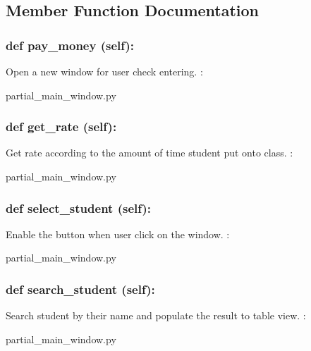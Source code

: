 \subsection{Member Function Documentation}
\hypertarget{class_poly_a14a7ad77ce612b0c54f531d307ee4b39}{
\subsubsection[{def pay_money (self):}]{\setlength{\rightskip}{0pt plus 5cm}def {pay\_money} (self):}}\label{class_poly_a14a7ad77ce612b0c54f531d307ee4b39}
Open a new window for user check entering.
:\begin{DoxyCompactItemize}
\item 
partial\_main\_window.\-py\end{DoxyCompactItemize}

\hypertarget{class_poly_a14a7ad77ce612b0c54f531d307ee4b39}{
\subsubsection[{def get_rate (self):}]{\setlength{\rightskip}{0pt plus 5cm}def {get\_rate} (self):}}\label{class_poly_a14a7ad77ce612b0c54f531d307ee4b39}
Get rate according to the amount of time student put onto class.
:\begin{DoxyCompactItemize}
\item 
partial\_main\_window.\-py\end{DoxyCompactItemize}

\hypertarget{class_poly_a14a7ad77ce612b0c54f531d307ee4b39}{
\subsubsection[{def select_student (self):}]{\setlength{\rightskip}{0pt plus 5cm}def {select\_student} (self):}}\label{class_poly_a14a7ad77ce612b0c54f531d307ee4b39}
Enable the button when user click on the window. 
:\begin{DoxyCompactItemize}
\item 
partial\_main\_window.\-py\end{DoxyCompactItemize}

\hypertarget{class_poly_a14a7ad77ce612b0c54f531d307ee4b39}{
\subsubsection[{def search_student (self):}]{\setlength{\rightskip}{0pt plus 5cm}def {search\_student} (self):}}\label{class_poly_a14a7ad77ce612b0c54f531d307ee4b39}
Search student by their name and populate the result to table view. 
:\begin{DoxyCompactItemize}
\item 
partial\_main\_window.\-py\end{DoxyCompactItemize}

